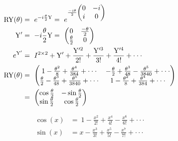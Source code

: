 \begin{equation}
    \centering
    \begin{split}
        \mathrm{RY}(\theta) &=\ e^{-i\frac{\theta}{2}\mathrm{Y}} =\ e^{\frac{-i\theta}{2}\begin{pmatrix} 0 & -i \\ i & 0 \end{pmatrix}} \\
        \mathrm{Y}' &=\ -i\frac{\theta}{2}\mathrm{Y} =\ \begin{pmatrix}
                                                         0 & \frac{-\theta}{2}\\
                                                         \frac{\theta}{2} & 0\\
                                                    \end{pmatrix} \\
        e^{\mathrm{Y}'} &=\ I^{2\times2} + \mathrm{Y}' + \frac{\mathrm{Y}'^2}{2!} + \frac{\mathrm{Y}'^3}{3!} + \frac{\mathrm{Y}'^4}{4!} + \cdot\cdot\cdot \\
        \mathrm{RY}(\theta) &=\ \begin{pmatrix}
         1 - \frac{\theta^2}{8} + \frac{\theta^4}{384} + \cdot\cdot\cdot & - \frac{\theta}{2} + \frac{\theta^3}{48} - \frac{\theta^5}{3840} + \cdot\cdot\cdot\\
         \frac{\theta}{2} - \frac{\theta^3}{48} + \frac{\theta^5}{3840} + \cdot\cdot\cdot & 1 - \frac{\theta^2}{8} + \frac{\theta^4}{384} + \cdot\cdot\cdot \\
         \end{pmatrix}\\ &=\ \begin{pmatrix}
        \cos{\frac{\theta}{2}} & -\sin{\frac{\theta}{2}} \\
        \sin{\frac{\theta}{2}} & \cos{\frac{\theta}{2}}
    \end{pmatrix}
    \end{split}
    \label{equation:ry_gate_proof}
\end{equation}



\begin{equation}
    \begin{split}
        \cos(x) &=\ 1 - \frac{x^2}{2!} + \frac{x^4}{4!} - \frac{x^6}{6!} + \cdot\cdot\cdot \\
        \sin(x) &= x - \frac{x^3}{3!} + \frac{x^5}{5!} - \frac{x^7}{7!} + \cdot\cdot\cdot
    \end{split}
    \label{equation:power_series_sin_cos}
\end{equation}

